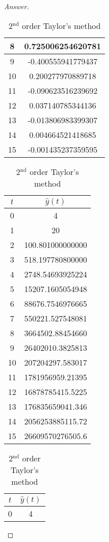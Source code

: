 \begin{proof}[Answer]
\begin{table}[H]
\begin{table}[htbp]
\begin{subtable}[t]{0.32\textwidth}
\begin{tabular}[t]{|c|c|}
		8	&	0.725006254620781	\\	\hline
		9	&	-0.400555941779437	\\	\hline
		10	&	0.200277970889718	\\	\hline
		11	&	-0.090623516239692	\\	\hline
		12	&	0.037140785344136	\\	\hline
		13	&	-0.013806983399307	\\	\hline
		14	&	0.004664521418685	\\	\hline
		15	&	-0.001435237359595	\\	\hline
		\end{tabular}
		\caption{Backward Euler's method}
	\end{subtable}
	\begin{subtable}[t]{0.32\textwidth}
		\centering
		\begin{tabular}[t]{|c|c|}
		\hline
		\(t\)	&	\(\hat{y}(t)\)	\\	\hline
		0	&	4					\\	\hline
		1	&	20					\\	\hline
		2	&	100.801000000000	\\	\hline
		3	&	518.197780800000	\\	\hline
		4	&	2748.54693925224	\\	\hline
		5	&	15207.1605054948	\\	\hline
		6	&	88676.7546976665	\\	\hline
		7	&	550221.527548081	\\	\hline
		8	&	3664502.88454660	\\	\hline
		9	&	26402010.3825813	\\	\hline
		10	&	207204297.583017	\\	\hline
		11	&	1781956959.21395	\\	\hline
		12	&	16878785415.5225	\\	\hline
		13	&	176835659041.346	\\	\hline
		14	&	2056253885115.72	\\	\hline
		15	&	26609570276505.6	\\	\hline
		\end{tabular}
		\caption{2\(^\text{nd}\) order Taylor's method}
	\end{subtable}
	\begin{subtable}[t]{0.32\textwidth}
		\centering
		\begin{tabular}[t]{|c|c|}
		\hline
		\(t\)	&	\(\hat{y}(t)\)	\\	\hline
		0	&	4					\\	\hline

\end{tabular}
\end{subtable}
\end{table}
\end{table}
\end{proof}
